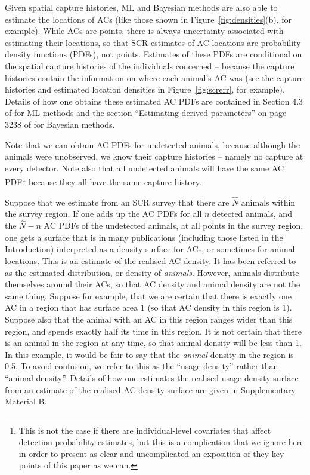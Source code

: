 \documentclass[10pt,a4paper]{article}
\begin{document}
Given spatial capture histories, ML and Bayesian methods are also able to estimate the locations of ACs (like those shown in Figure~\ref{fig:densities}(b), for example). While ACs are points, there is always uncertainty associated with estimating their locations, so that SCR estimates of AC locations are probability density functions (PDFs), not points. Estimates of these PDFs are conditional on the spatial capture histories of the individuals concerned -- because the capture histories contain the information on where each animal's AC was (see the capture histories and estimated location densities in Figure~\ref{fig:screrr}, for example). Details of how one obtains these estimated AC PDFs are contained in Section 4.3 of \cite{Borchers+Efford:08} for ML methods and the section ``Estimating derived parameters'' on page 3238 of \cite{Royle+al:09b} for Bayesian methods.

Note that we can obtain AC PDFs for undetected animals, because although the animals were unobserved, we know their capture histories -- namely no capture at every detector. Note also that all undetected animals will have the same AC PDF\footnote{This is not the case if there are individual-level covariates that affect detection probability estimates, but this is a complication that we ignore here in order to present as clear and uncomplicated an exposition of they key points of this paper as we can.} because they all have the same capture history. 

Suppose that we estimate from an SCR survey that there are $\hat{N}$ animals within the survey region. If one adds up the AC PDFs for all $n$ detected animals, and the $\hat{N}-n$ AC PDFs of the undetected animals, at all points in the survey region, one gets a surface that is in many publications (including those listed in the Introduction) interpreted as a density surface for ACs, or sometimes for animal locations. This is an estimate of the realised AC density. It has been referred to as the estimated distribution, or density of \textit{animals}. However, animals distribute themselves around their ACs, so that AC density and animal density are not the same thing. Suppose for example, that we are certain that there is exactly one AC in a region that has surface area 1 (so that AC density in this region is 1). Suppose also that the animal with an AC in this region ranges wider than this region, and spends exactly half its time in this region. It is not certain that there is an animal in the region at any time, so that animal density will be less than 1. In this example, it would be fair to say that the \textit{animal} density in the region is 0.5. To avoid confusion, we refer to this as the ``usage density'' rather than ``animal density''. Details of how one estimates the realised usage density surface from an estimate of the realised AC density surface are given in Supplementary Material B.
\end{document}
